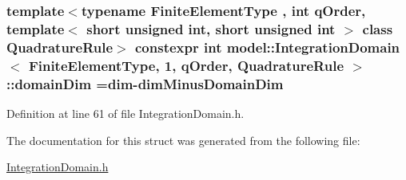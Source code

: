 \subsubsection[{domain\+Dim}]{\setlength{\rightskip}{0pt plus 5cm}template$<$typename Finite\+Element\+Type , int q\+Order, template$<$ short unsigned int, short unsigned int $>$ class Quadrature\+Rule$>$ constexpr int {\bf model\+::\+Integration\+Domain}$<$ Finite\+Element\+Type, 1, q\+Order, Quadrature\+Rule $>$\+::domain\+Dim ={\bf dim}-\/{\bf dim\+Minus\+Domain\+Dim}\hspace{0.3cm}{\ttfamily [static]}}\label{structmodel_1_1_integration_domain_3_01_finite_element_type_00_011_00_01q_order_00_01_quadrature_rule_01_4_a4794e96f792f2344e4ac5842f50f3fa3}


Definition at line 61 of file Integration\+Domain.\+h.



The documentation for this struct was generated from the following file\+:\begin{DoxyCompactItemize}
\item 
\hyperlink{_integration_domain_8h}{Integration\+Domain.\+h}\end{DoxyCompactItemize}
